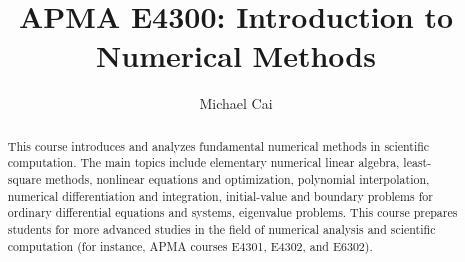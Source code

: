 \documentclass[a4paper]{report}
\author{Michael Cai}
\title{APMA E4300: Introduction to Numerical Methods
}
\begin{document}
\maketitle

\begin{abstract}
	This course introduces and analyzes fundamental numerical
methods in scientific computation. The main topics include elementary numerical linear algebra, least-square methods, nonlinear equations and optimization,
polynomial interpolation, numerical differentiation and integration, initial-value
and boundary problems for ordinary differential equations and systems, eigenvalue
problems. This course prepares students for more advanced studies in the field of
numerical analysis and scientific computation (for instance, APMA courses E4301,
E4302, and E6302).

\end{abstract}

\newpage

\tableofcontents

\end{document}
